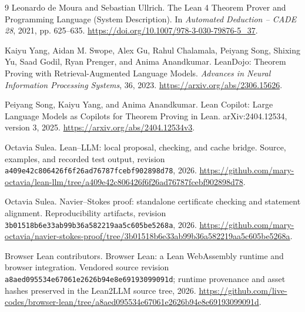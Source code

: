 \documentclass[10pt,a4paper]{article}
\newcommand{\code}[1]{\texttt{#1}}
\begin{document}
\begin{thebibliography}{9}
Leonardo de Moura and Sebastian Ullrich.
\newblock The Lean 4 Theorem Prover and Programming Language (System Description).
\newblock In \emph{Automated Deduction -- CADE 28}, 2021, pp. 625--635.
\newblock \url{https://doi.org/10.1007/978-3-030-79876-5_37}.

Kaiyu Yang, Aidan M. Swope, Alex Gu, Rahul Chalamala, Peiyang Song,
Shixing Yu, Saad Godil, Ryan Prenger, and Anima Anandkumar.
\newblock LeanDojo: Theorem Proving with Retrieval-Augmented Language Models.
\newblock \emph{Advances in Neural Information Processing Systems}, 36, 2023.
\newblock \url{https://arxiv.org/abs/2306.15626}.

Peiyang Song, Kaiyu Yang, and Anima Anandkumar.
\newblock Lean Copilot: Large Language Models as Copilots for Theorem Proving in Lean.
\newblock arXiv:2404.12534, version 3, 2025.
\newblock \url{https://arxiv.org/abs/2404.12534v3}.

Octavia Sulea.
\newblock Lean--LLM: local proposal, checking, and cache bridge.
\newblock Source, examples, and recorded test output, revision
\code{a409e42c806426f6f26ad76787fcebf902898d78}, 2026.
\newblock \url{https://github.com/mary-octavia/lean-llm/tree/a409e42c806426f6f26ad76787fcebf902898d78}.

Octavia Sulea.
\newblock Navier--Stokes proof: standalone certificate checking and statement alignment.
\newblock Reproducibility artifacts, revision
\code{3b01518b6e33ab99b36a582219aa5c605be5268a}, 2026.
\newblock \url{https://github.com/mary-octavia/navier-stokes-proof/tree/3b01518b6e33ab99b36a582219aa5c605be5268a}.

Browser Lean contributors.
\newblock Browser Lean: a Lean WebAssembly runtime and browser integration.
\newblock Vendored source revision
\code{a8aed095534e67061e2626b94e8e69193099091d}; runtime provenance and asset
hashes preserved in the Lean2LLM source tree, 2026.
\newblock \url{https://github.com/live-codes/browser-lean/tree/a8aed095534e67061e2626b94e8e69193099091d}.
\end{thebibliography}
\end{document}
